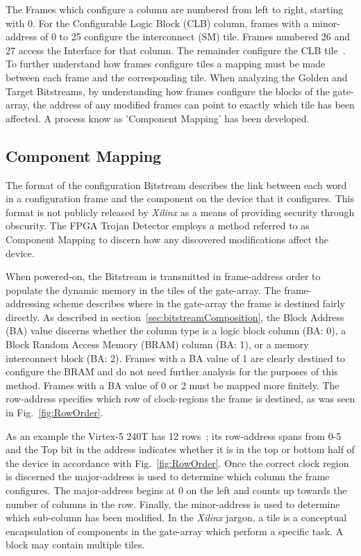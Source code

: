 \documentclass[journal, hidelinks]{IEEEtran}
\begin{document}
The Frames which configure a column are numbered from left to right, starting with 0.  
For the Configurable Logic Block (CLB) column, frames with a minor-address of 0 to 25 configure the interconnect (SM) tile.
Frames numbered 26 and 27 access the Interface for that column. 
The remainder configure the CLB tile~\cite{virtex5ConfigGuide}.
To further understand how frames configure tiles a mapping must be made between each frame and the corresponding tile.
When analyzing the Golden and Target Bitstreams, by understanding how frames configure the blocks of the gate-array, the address of any modified frames can point to exactly which tile has been affected.
A process know as 'Component Mapping' has been developed. 

\subsection{Component Mapping} \label{sec:tileMapping}
The format of the configuration Bitstream describes the link between each word in a configuration frame and the component on the device that it configures. 
This format is not publicly released by \textit{Xilinx} as a means of providing security through obscurity.
The FPGA Trojan Detector employs a method referred to as Component Mapping to discern how any discovered modifications affect the device.

When powered-on, the Bitstream is transmitted in frame-address order to populate the dynamic memory in the tiles of the gate-array.
The frame-addressing scheme describes where in the gate-array the frame is destined fairly directly.
As described in section~\ref{sec:bitstreamComposition}, the Block Address (BA) value discerns whether the column type is a logic block column (BA: 0), a Block Random Access Memory (BRAM) column (BA: 1), or a memory interconnect block (BA: 2).
Frames with a BA value of 1 are clearly destined to configure the BRAM and do not need further analysis for the purposes of this method.
Frames with a BA value of 0 or 2 must be mapped more finitely.
The row-address specifies which row of clock-regions the frame is destined, as was seen in Fig.~\ref{fig:RowOrder}.

As an example the Virtex-5 240T has 12 rows~\cite{virtex5ConfigGuide}; its row-address spans from 0-5 and the Top bit in the address indicates whether it is in the top or bottom half of the device in accordance with Fig.~\ref{fig:RowOrder}.
Once the correct clock region is discerned the major-address is used to determine which column the frame configures.
The major-address begins at 0 on the left and counts up towards the number of columns in the row.
Finally, the minor-address is used to determine which sub-column has been modified.
In the \textit{Xilinx} jargon, a tile is a conceptual encapsulation of components in the gate-array which perform a specific task.
A block may contain multiple tiles.
\end{document}
